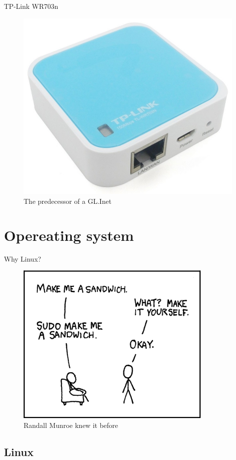 \documentclass[hyperref={unicode}]{beamer}
\begin{document}
\begin{frame}{TP-Link WR703n}
	\begin{figure}
	\includegraphics[width=.7\textwidth]{wr703n.jpg}
	\caption{The predecessor of a GL.Inet}
	\end{figure}
\end{frame}


\section{Opereating system}

\begin{frame}{Why Linux?}
	\begin{figure}
	\includegraphics[width=.7\textwidth]{sandwich.png}
	\caption{Randall Munroe knew it before}
	\end{figure}
\end{frame}

\subsection{Linux}
\end{document}
